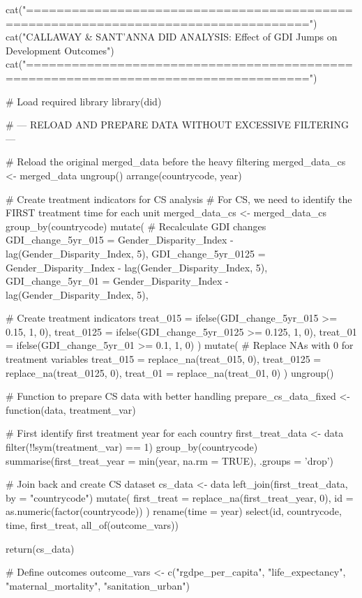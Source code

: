 {{{cat("\n===================================================================================\n")
cat("CALLAWAY & SANT'ANNA DID ANALYSIS: Effect of GDI Jumps on Development Outcomes\n")
cat("===================================================================================\n\n")

# Load required library
library(did)

# --- RELOAD AND PREPARE DATA WITHOUT EXCESSIVE FILTERING ---

# Reload the original merged_data before the heavy filtering
merged_data_cs <- merged_data %
  ungroup() %
  arrange(countrycode, year)

# Create treatment indicators for CS analysis
# For CS, we need to identify the FIRST treatment time for each unit
merged_data_cs <- merged_data_cs %
  group_by(countrycode) %
  mutate(
    # Recalculate GDI changes
    GDI_change_5yr_015 = Gender_Disparity_Index - lag(Gender_Disparity_Index, 5),
    GDI_change_5yr_0125 = Gender_Disparity_Index - lag(Gender_Disparity_Index, 5),
    GDI_change_5yr_01 = Gender_Disparity_Index - lag(Gender_Disparity_Index, 5),
    
    # Create treatment indicators
    treat_015 = ifelse(GDI_change_5yr_015 >= 0.15, 1, 0),
    treat_0125 = ifelse(GDI_change_5yr_0125 >= 0.125, 1, 0),
    treat_01 = ifelse(GDI_change_5yr_01 >= 0.1, 1, 0)
  ) %
  mutate(
    # Replace NAs with 0 for treatment variables
    treat_015 = replace_na(treat_015, 0),
    treat_0125 = replace_na(treat_0125, 0),
    treat_01 = replace_na(treat_01, 0)
  ) %
  ungroup()

# Function to prepare CS data with better handling
prepare_cs_data_fixed <- function(data, treatment_var) {
  
  # First identify first treatment year for each country
  first_treat_data <- data %
    filter(!!sym(treatment_var) == 1) %
    group_by(countrycode) %
    summarise(first_treat_year = min(year, na.rm = TRUE), .groups = 'drop')
  
  # Join back and create CS dataset
  cs_data <- data %
    left_join(first_treat_data, by = "countrycode") %
    mutate(
      first_treat = replace_na(first_treat_year, 0),
      id = as.numeric(factor(countrycode))
    ) %
    rename(time = year) %
    select(id, countrycode, time, first_treat, all_of(outcome_vars))
  
  return(cs_data)
}

# Define outcomes
outcome_vars <- c("rgdpe_per_capita", "life_expectancy", "maternal_mortality",
                  "sanitation_urban")

}}}
